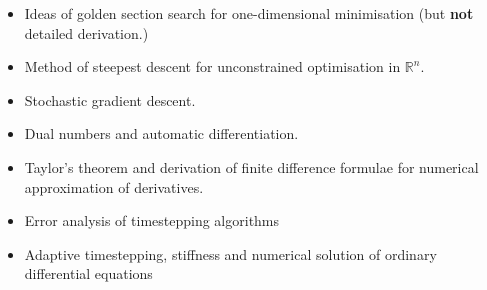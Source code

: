 \documentclass[11pt]{article}
\begin{document}
\begin{multicols}{2}
\begin{itemize}
\item Ideas of golden section search for one-dimensional minimisation (but {\bf not} detailed derivation.)
\item Method of steepest descent for unconstrained optimisation in $\mathbb{R}^n$.
\item Stochastic gradient descent.
\item Dual numbers and automatic differentiation.
\item Taylor's theorem and derivation of finite difference formulae for numerical approximation of derivatives.
\item Error analysis of timestepping algorithms
\item Adaptive timestepping, stiffness and numerical solution of ordinary differential equations
\end{itemize}


\end{multicols}
\end{document}
